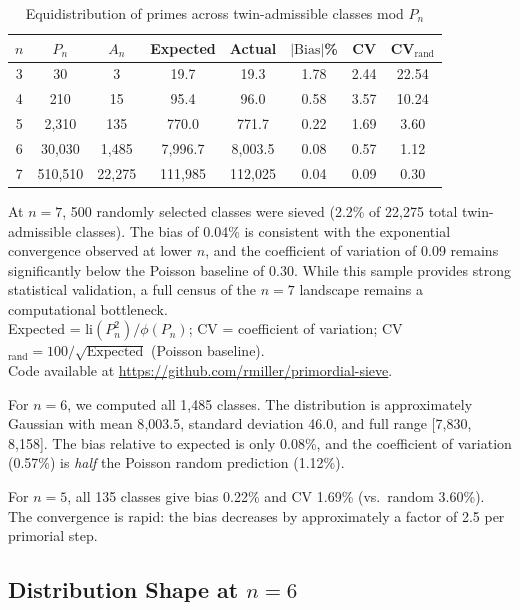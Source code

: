 \documentclass[11pt]{article}
\begin{document}
\begin{table}[h]
\centering
\caption{Equidistribution of primes across twin-admissible classes mod $P_n$}
\label{tab:numerical}
\begin{tabular}{cccccccc}
\toprule
$n$ & $P_n$ & $A_n$ & Expected & Actual & $|\text{Bias}|$\% & CV & CV$_{\text{rand}}$ \\
\midrule
3 & 30 & 3 & 19.7 & 19.3 & 1.78 & 2.44 & 22.54 \\
4 & 210 & 15 & 95.4 & 96.0 & 0.58 & 3.57 & 10.24 \\
5 & 2{,}310 & 135 & 770.0 & 771.7 & 0.22 & 1.69 & 3.60 \\
6 & 30{,}030 & 1{,}485 & 7{,}996.7 & 8{,}003.5 & 0.08 & 0.57 & 1.12 \\
7 & 510{,}510 & 22{,}275 & 111{,}985 & 112{,}025 & 0.04 & 0.09 & 0.30 \\
\bottomrule
\end{tabular}

At $n=7$, 500 randomly selected classes were sieved (2.2\% of 22{,}275 total
twin-admissible classes). The bias of 0.04\% is consistent with the
exponential convergence observed at lower $n$, and the coefficient of variation of 0.09
remains significantly below the Poisson baseline of 0.30.
While this sample provides strong statistical validation, a full census
of the $n=7$ landscape remains a computational bottleneck.\\
Expected = $\mathrm{li}(P_n^2)/\phi(P_n)$; CV = coefficient of variation;
CV$_{\text{rand}} = 100/\sqrt{\text{Expected}}$ (Poisson baseline).\\
Code available at \url{https://github.com/rmiller/primordial-sieve}.
\end{table}

For $n=6$, we computed all 1{,}485 classes. The distribution is
approximately Gaussian with mean 8{,}003.5, standard deviation 46.0,
and full range [7{,}830, 8{,}158]. The bias relative to expected is
only 0.08\%, and the coefficient of variation (0.57\%) is \emph{half}
the Poisson random prediction (1.12\%).

For $n=5$, all 135 classes give bias 0.22\% and CV 1.69\% (vs.\ random
3.60\%). The convergence is rapid: the bias decreases by approximately
a factor of 2.5 per primorial step.

\subsection{Distribution Shape at $n=6$}
\end{document}
